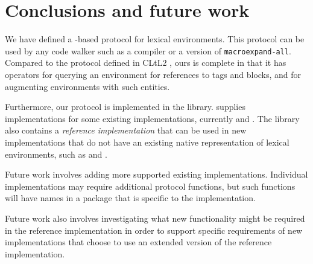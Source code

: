 \section{Conclusions and future work}

We have defined a \clos{}-based protocol for lexical environments.
This protocol can be used by any code walker such as a compiler or a
version of \texttt{macroexpand-all}.  Compared to the protocol defined
in CLtL2 \cite{Steele:1990:CLL:95411}, ours is complete in that it has
operators for querying an environment for references to tags and
blocks, and for augmenting environments with such entities.

Furthermore, our protocol is implemented in the \trucler{} library.
\trucler{} supplies implementations for some existing \commonlisp{}
implementations, currently \sbcl{} and \ccl{}.  The library also
contains a \emph{reference implementation} that can be used in new
\commonlisp{} implementations that do not have an existing native
representation of lexical environments, such as \sicl{} and \clasp{}.

Future work involves adding more supported existing \commonlisp{}
implementations.  Individual implementations may require additional
protocol functions, but such functions will have names in a package
that is specific to the implementation.

Future work also involves investigating what new functionality might
be required in the reference implementation in order to support
specific requirements of new \commonlisp{} implementations that choose
to use an extended version of the \trucler{} reference
implementation.
